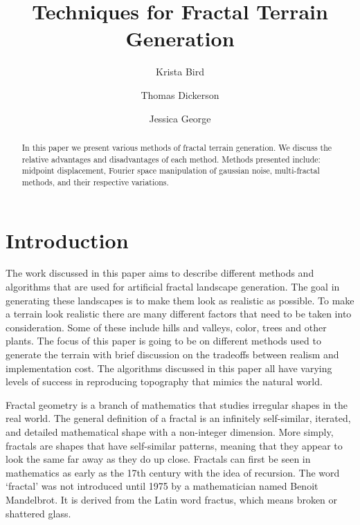 \documentclass[11pt,twocolumn]{article}
\title{Techniques for Fractal Terrain Generation}
\author{Krista Bird \and Thomas Dickerson \and Jessica George}
\begin{document}
    \maketitle

    \begin{abstract}
    In this paper we present various methods of fractal terrain generation.
	We discuss the relative advantages and disadvantages of each method. Methods presented include: midpoint displacement,
	Fourier space manipulation of gaussian noise, multi-fractal methods, and their respective variations. 
    \end{abstract}
     
    \section{Introduction}
	\label{sec:intro}
	The work discussed in this paper aims to describe different methods and algorithms that are used for artificial fractal
	landscape generation.  The goal in generating these landscapes is to make them look as realistic as possible.
	To make a terrain look realistic there are many different factors that need to be taken into consideration.
	Some of these include hills and valleys, color, trees and other plants. The focus of this paper is going to be
	on different methods used to generate the terrain with brief discussion on the tradeoffs between realism and implementation cost.
	The algorithms discussed in this paper all have varying levels of success in reproducing topography that mimics the natural world. 

	Fractal geometry is a branch of mathematics that studies irregular shapes in the real world. The general definition of a
	fractal is an infinitely self-similar, iterated, and detailed mathematical shape with a non-integer dimension. More simply,
	fractals are shapes that have self-similar patterns, meaning that they appear to look the same far away as they do up close.
	Fractals can first be seen in mathematics as early as the 17th century with the idea of recursion.  The word `fractal' was not
	introduced until 1975 by a mathematician named Benoit Mandelbrot. It is derived from the Latin word fractus, which means broken
	or shattered glass. 
\end{document}
